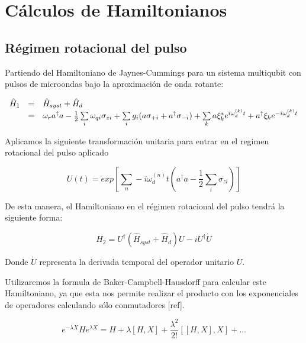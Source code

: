 \chapter{Cálculos de Hamiltonianos}
\label{ch:hamiltonians}

\section{Régimen rotacional del pulso}

Partiendo del Hamiltoniano de Jaynes-Cummings para un sistema multiqubit con pulsos de microondas bajo la aproximación de onda rotante:

\begin{equation}
    \begin{array}{r c l}
        \hat{H}_1 &=& \hat{H}_{syst} + \hat{H}_d \\
                  &=& \omega_r a^\dag a - \frac{1}{2} \sum\limits_i \omega_{qi} \sigma_{zi} + \sum\limits_i g_i (a \sigma_{+ i} + a^\dagger \sigma_{- i}) + \sum\limits_k a\xi_k^*e^{i\omega_d^{(k)}t}+ a^\dagger\xi_ke^{-i\omega_d^{(k)}t}
    \end{array}
\end{equation}

Aplicamos la siguiente transformación unitaria para entrar en el regimen rotacional del pulso aplicado

\begin{equation}
    U(t) = exp[\sum\limits_n-i \omega_d^{(n)} t(a^\dagger a - \frac{1}{2} \sum\limits_i \sigma_{z i})]
\end{equation}

De esta manera, el Hamiltoniano en el régimen rotacional del pulso tendrá la siguiente forma:

\begin{equation}
    \hat{H}_2 = U^\dagger (\hat{H}_{syst} + \hat{H}_d) U - i U^\dagger \dot{U}
\end{equation}

Donde $\dot{U}$ representa la derivada temporal del operador unitario $U$.

Utilizaremos la formula de Baker-Campbell-Hausdorff para calcular este Hamiltoniano, ya que esta nos permite realizar el producto con los exponenciales de operadores calculando sólo conmutadores [ref].

\begin{equation}
    e^{-\lambda X} H e^{\lambda X} = H + \lambda [H,X] + \frac{\lambda^2}{2!}[[H,X],X] + ...
\end{equation}

